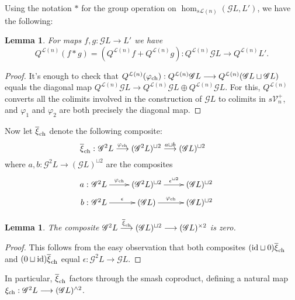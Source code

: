 \documentclass[11pt]{amsart}
\theoremstyle{plain}
\newtheorem{lem}[thm]{Lemma}
\theoremstyle{definition}
\let\phi\varphi
\renewcommand{\to}{\longrightarrow}
\newcommand{\scrG}{\mathscr{G}}
\newcommand{\calL}{\mathcal{L}}
\newcommand{\calV}{\mathcal{V}}
\theoremstyle{plain}
\newcommand{\vect}[2]{\calV^{#1}_{#2}}
\newcommand{\BSW}{{\scrG}}
\newcommand{\Id}{\textup{id}}
\begin{document}
\begin{comp func sseq old version}
\begin{shaded}
Using the notation $*$ for the group operation on $\hom_{s\calL(n)}(\BSW L,L')$, we have the following:
\begin{lem}
For maps $f,g:\BSW L\to L'$ we have 
\[Q^{\calL(n)}(f*g)=(Q^{\calL(n)}f+Q^{\calL(n)}g):Q^{\calL(n)}\BSW L\to Q^{\calL(n)}L'.\]
\end{lem}
\begin{proof}
It's enough to check that $Q^{\calL(n)}(\phi_\textup{ch}):Q^{\calL(n)}\BSW L\to Q^{\calL(n)}(\BSW L\sqcup \BSW L)$ equals the diagonal map $Q^{\calL(n)}\BSW L\to Q^{\calL(n)}\BSW L\oplus Q^{\calL(n)}\BSW L$. For this, $Q^{\calL(n)}$ converts all the colimits involved in the construction of $\BSW L$ to colimits in $s\vect{+}{n}$, and $\phi_1$ and $\phi_2$ are both precisely the diagonal map.
\end{proof}

Now let $\overline{\xi}_{\textup{ch}}$ denote the following composite:
\[\makebox[0mm][r]{$\overline{\xi}_{\textup{ch}}:\ $}\BSW^2L\overset{\phi_{\textup{ch}}}{\to}(\BSW^2L)^{\sqcup2}\overset{a\sqcup b}{\to}(\BSW L)^{\sqcup2}\]
where $a,b:\BSW^2L\to(\BSW L)^{\sqcup2}$ are the composites
\[\xymatrix@R=2mm{
\makebox[0mm][r]{$a:\ $}\BSW^2L\ar[r]^-{\phi_{\textup{ch}}}
&%
(\BSW^2L)^{\sqcup2}\ar[r]^-{\epsilon^{\sqcup2}}
&%
(\BSW L)^{\sqcup2}\\
\makebox[0mm][r]{$b:\ $}\BSW^2L\ar[r]^-{\epsilon}
&%
(\BSW L)\ar[r]^-{\phi_{\textup{ch}}}
&%
(\BSW L)^{\sqcup2}
}\]
\begin{lem}
The composite 
$\BSW^2L\overset{\overline{\xi}_{\textup{ch}}}{\to}(\BSW L)^{\sqcup2}\to(\BSW L)^{\times2}$ is zero.
\end{lem}
\begin{proof}
This follows from the easy observation that both composites $(\Id\sqcup0)\overline{\xi}_{\textup{ch}}$ and $(0\sqcup\Id)\overline{\xi}_{\textup{ch}}$ equal $\epsilon:\BSW^2L\to \BSW L$.
\end{proof}
In particular, $\overline{\xi}_{\textup{ch}}$ factors through the smash coproduct, defining a natural map $\xi_{\textup{ch}}:\BSW^2L\to (\BSW L)^{\wedge 2}$.


\end{shaded}
\end{comp func sseq old version}
\end{document}
